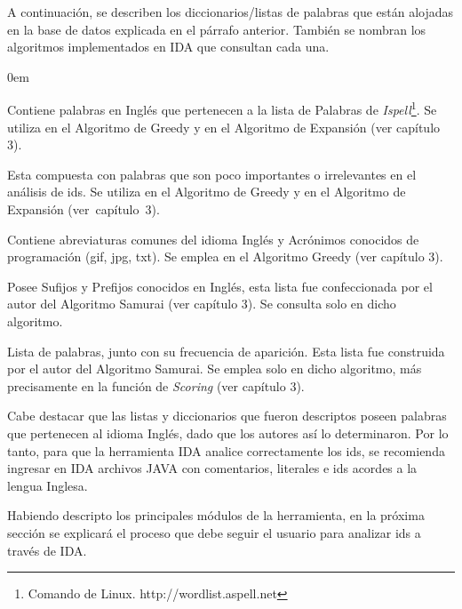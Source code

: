 A continuación, se describen los diccionarios/listas de palabras que están alojadas en la base de datos explicada en el párrafo anterior. También se nombran los algoritmos implementados en IDA que consultan cada una.

\begin{description}
\itemsep0em%

\item[Diccionario en Inglés (ispell):] Contiene palabras en Inglés que pertenecen a la lista de Palabras de \textit{Ispell}\footnote[1]{Comando de Linux. http://wordlist.aspell.net}. Se utiliza en el Algoritmo de Greedy y en el Algoritmo de Expansión (ver capítulo 3).

\item[Lista de Palabras Excluyentes (stop-list):] Esta compuesta con palabras que son poco importantes o irrelevantes en el análisis de ids. Se utiliza en el Algoritmo de Greedy y en el Algoritmo de Expansión \mbox{(ver capítulo 3)}.

\item[Lista de Abreviaturas y Acrónimos Conocidas:] Contiene abreviaturas comunes del idioma Inglés y Acrónimos conocidos de programación (gif, jpg, txt). Se emplea en el Algoritmo Greedy (ver capítulo 3).

\item[Lista de Prefijos y Sufijos Conocidos:] Posee Sufijos y Prefijos conocidos en Inglés, esta lista fue confeccionada por el autor del Algoritmo Samurai (ver capítulo 3). Se consulta solo en dicho algoritmo.

\item[Frecuencias Globales de Palabras:] Lista de palabras, junto con su frecuencia de aparición. Esta lista fue construida por el autor del Algoritmo Samurai. Se emplea solo en dicho algoritmo, más precisamente en la función de \textit{Scoring} (ver capítulo 3).

\end{description}

Cabe destacar que las listas y diccionarios que fueron descriptos poseen palabras que pertenecen al idioma Inglés, dado que los autores así lo determinaron. Por lo tanto, para que la herramienta IDA analice correctamente los ids, se recomienda ingresar en IDA archivos JAVA con comentarios, literales e ids acordes a la lengua Inglesa. 

Habiendo descripto los principales módulos de la herramienta, en la próxima sección se explicará el proceso que debe seguir el usuario para analizar ids a través de IDA.
 
